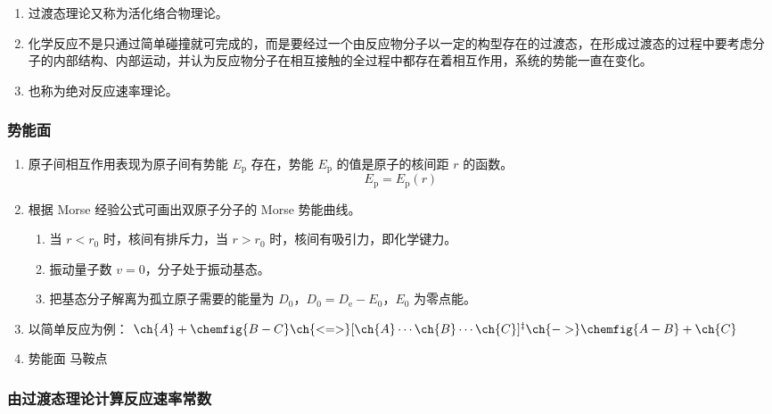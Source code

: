 \begin{enumerate}
    \item 过渡态理论又称为活化络合物理论。
    \item 化学反应不是只通过简单碰撞就可完成的，而是要经过一个由反应物分子以一定的构型存在的过渡态，在形成过渡态的过程中要考虑分子的内部结构、内部运动，并认为反应物分子在相互接触的全过程中都存在着相互作用，系统的势能一直在变化。
    \item 也称为绝对反应速率理论。
\end{enumerate}

\subsubsection{势能面}

\begin{enumerate}
    \item 原子间相互作用表现为原子间有势能 $E_{\mathrm{p}}$ 存在，势能 $E_{\mathrm{p}}$ 的值是原子的核间距 $r$ 的函数。
    \begin{equation}
        E_{\mathrm{p}} = E_{\mathrm{p}}(r)
    \end{equation}
    \item 根据 Morse 经验公式可画出双原子分子的 Morse 势能曲线。 %
    
    \begin{enumerate}
        \item 当 $r < r_0$ 时，核间有排斥力，当 $r > r_0$ 时，核间有吸引力，即化学键力。
        \item 振动量子数 $v = 0$，分子处于振动基态。
        \item 把基态分子解离为孤立原子需要的能量为 $D_0$，$D_0 = D_{\mathrm{e}} - E_0$，$E_0$ 为零点能。
    \end{enumerate}
    \item 以简单反应为例：
        $\ch{A} + \chemfig{B-C}
        \ch{<=>}
        [\ch{A} \cdots \ch{B} \cdots \ch{C}]^{\ddagger}
        \ch{->}
        \chemfig{A-B} + \ch{C}$
    \item 势能面 马鞍点
\end{enumerate}

\subsubsection{由过渡态理论计算反应速率常数}

